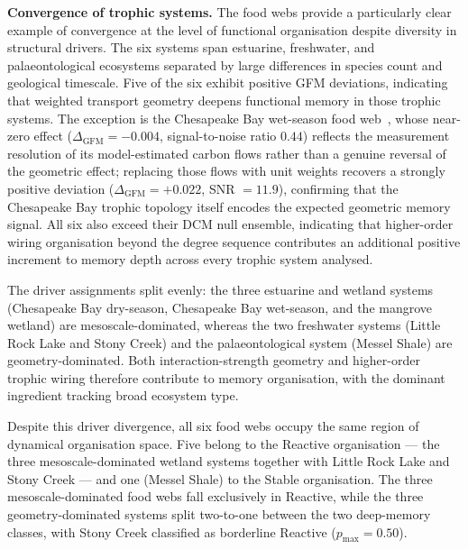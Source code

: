 \documentclass[aps,superscriptaddress,11pt]{revtex4-2}
\theoremstyle{definition}
\theoremstyle{plain}
\begin{document}
\medskip

\noindent\textbf{Convergence of trophic systems.}
The food webs provide a particularly clear example of convergence at the
level of functional organisation despite diversity in structural drivers.
The six systems span estuarine, freshwater, and palaeontological ecosystems
separated by large differences in species count and geological timescale.
Five of the six exhibit positive GFM deviations, indicating that weighted
transport geometry deepens functional memory in those trophic systems. The
exception is the Chesapeake Bay wet-season food web~\cite{Baird1989},
whose near-zero effect ($\Delta_{\mathrm{GFM}} = -0.004$, signal-to-noise
ratio $0.44$) reflects the measurement resolution of its model-estimated
carbon flows rather than a genuine reversal of the geometric effect; replacing those 
flows with unit weights recovers a strongly positive
deviation ($\Delta_{\mathrm{GFM}} = +0.022$, SNR $= 11.9$), confirming
that the Chesapeake Bay trophic topology itself encodes the expected
geometric memory signal.
All six also exceed their DCM null ensemble, indicating that higher-order
wiring organisation beyond the degree sequence contributes an additional
positive increment to memory depth across every trophic system analysed.

The driver assignments split evenly: the three estuarine and wetland
systems (Chesapeake Bay dry-season, Chesapeake Bay wet-season, and the
mangrove wetland) are mesoscale-dominated, whereas the two freshwater
systems (Little Rock Lake and Stony Creek) and the palaeontological
system (Messel Shale) are geometry-dominated. Both interaction-strength
geometry and higher-order trophic wiring therefore contribute to memory
organisation, with the dominant ingredient tracking broad ecosystem type.

Despite this driver divergence, all six food webs occupy the same region
of dynamical organisation space. Five belong to the Reactive organisation
--- the three mesoscale-dominated wetland systems together with Little Rock
Lake and Stony Creek --- and one (Messel Shale) to the Stable organisation.
The three mesoscale-dominated food webs fall exclusively in Reactive,
while the three geometry-dominated systems split two-to-one between the
two deep-memory classes, with Stony Creek classified as borderline
Reactive ($p_{\max} = 0.50$).
\end{document}
